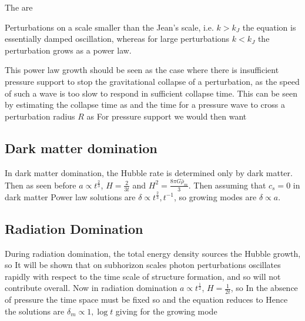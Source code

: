 \documentclass{article}
\begin{document}
\begin{definition}
The  are
\end{definition}

Perturbations on a scale smaller than the Jean's scale, i.e. $k>k_J$ the equation is essentially damped oscillation, whereas for large perturbations $k<k_J$ the perturbation grows as a power law. 

\begin{idea}
This power law growth should be seen as the case where there is insufficient pressure support to stop the gravitational collapse of a perturbation, as the speed of such a wave is too slow to respond in sufficient collapse time. This can be seen by estimating the collapse time as 
and the time for a pressure wave to cross a perturbation radius $R$ as 
For pressure support we would then want 
\end{idea}




\subsection{Dark matter domination}
In dark matter domination, the Hubble rate is determined only by dark matter. Then as seen before $a\propto t^{\frac{2}{3}}$,  $H=\frac{2}{3t}$ and $H^2=\frac{8\pi G\bar{\rho}_m}{3}$. Then assuming that $c_s=0$ in dark matter
Power law solutions are $\delta \propto t^\frac{2}{3}, t^{-1}$, so growing modes are $\delta \propto a$. 

\subsection{Radiation Domination}
During radiation domination, the total energy density sources the Hubble growth, so 
It will be shown that on subhorizon scales photon perturbations oscillates rapidly with respect to the time scale of structure formation, and so will not contribute overall. Now in radiation domination $a\propto t^\frac{1}{2}$, $H=\frac{1}{2t}$, so 
In the absence of pressure the time space must be fixed so 
and the equation reduces to 
Hence the solutions are $\delta_m \propto 1, \log t$ 
giving for the growing mode 
\end{document}
